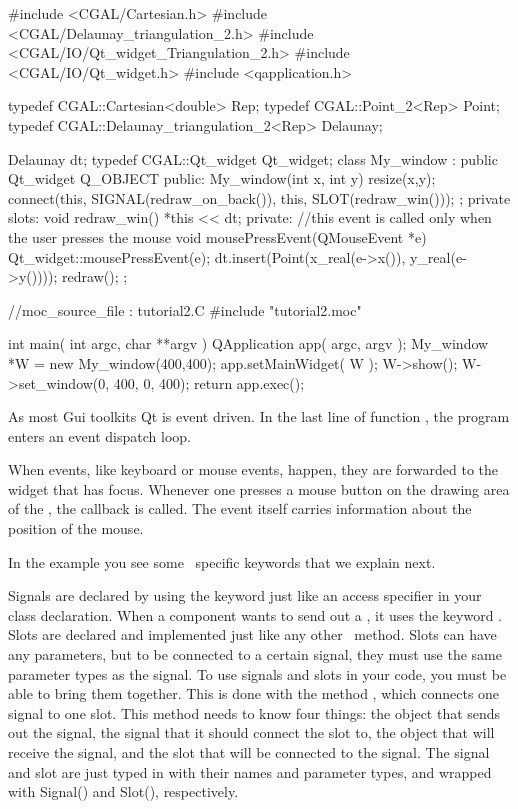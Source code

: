 \ccExample
\begin{ccExampleCode}
#include <CGAL/Cartesian.h>
#include <CGAL/Delaunay_triangulation_2.h>
#include <CGAL/IO/Qt_widget_Triangulation_2.h>
#include <CGAL/IO/Qt_widget.h>
#include <qapplication.h>

typedef CGAL::Cartesian<double>             Rep;
typedef CGAL::Point_2<Rep>                  Point;
typedef CGAL::Delaunay_triangulation_2<Rep> Delaunay;

Delaunay dt;
typedef CGAL::Qt_widget Qt_widget;
class My_window : public Qt_widget {
  Q_OBJECT
public:
  My_window(int x, int y){
    resize(x,y);
    connect(this, SIGNAL(redraw_on_back()),
           this, SLOT(redraw_win()));
  };
private slots:  
  void redraw_win()
  {
    *this << dt;
  }
private:
  //this event is called only when the user presses the mouse
  void mousePressEvent(QMouseEvent *e)
  {
    Qt_widget::mousePressEvent(e);
    dt.insert(Point(x_real(e->x()), y_real(e->y())));
    redraw();
  }
};

//moc_source_file : tutorial2.C
#include "tutorial2.moc"

int main( int argc, char **argv )
{
    QApplication app( argc, argv );
    My_window *W = new My_window(400,400);
    app.setMainWidget( W );
    W->show();
    W->set_window(0, 400, 0, 400);
    return app.exec();
}

\end{ccExampleCode}

As most {\sc Gui} toolkits Qt is event driven.  In the last line
of function , the program enters an event dispatch loop.

When events, like keyboard or mouse events, happen, they
are forwarded to the widget that has focus.  Whenever one
presses a mouse button on the drawing area of the ,
the callback  is called.
The event itself carries information about the position of the mouse.

In the example you see some \cgalqt\ specific keywords that we explain
next.

Signals are declared by using the keyword  just like an
access specifier in your class declaration. When a component wants to
send out a , it uses the keyword . Slots are
declared and implemented just like any other \CC\ method. Slots can
have any parameters, but to be connected to a certain signal, they
must use the same parameter types as the signal. To use signals and
slots in your code, you must be able to bring them together. This is
done with the method , which connects one
signal to one slot. This method needs to know four things: the object
that sends out the signal, the signal that it should connect the slot
to, the object that will receive the signal, and the slot that will be 
connected to the signal. The signal and slot are just typed in with
their names and parameter types, and wrapped with {\sc Signal()} and
{\sc Slot()}, respectively.

